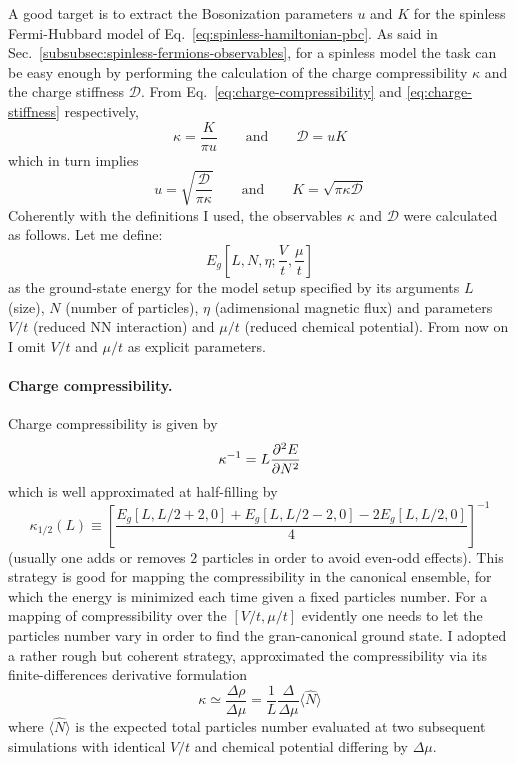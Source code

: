 A good target is to extract the Bosonization parameters $u$ and $K$ for the spinless Fermi-Hubbard model of Eq.~\eqref{eq:spinless-hamiltonian-pbc}. As said in Sec.~\ref{subsubsec:spinless-fermions-observables}, for a spinless model the task can be easy enough by performing the calculation of the charge compressibility $\kappa$ and the charge stiffness $\mathcal{D}$. From Eq.~\eqref{eq:charge-compressibility} and \eqref{eq:charge-stiffness} respectively,
\begin{equation}\label{eq:charge-compressibility-stiffness-definitions}
	\kappa = \frac{K}{\pi u}
	\qquad\text{and}\qquad
	\mathcal{D} = uK
\end{equation}
which in turn implies
\begin{equation}\label{eq:u-K-formulas}
	u = \sqrt{\frac{\mathcal{D}}{\pi\kappa}}
	\qquad\text{and}\qquad
	K = \sqrt{\pi\kappa\mathcal{D}}
\end{equation}
Coherently with the definitions I used, the observables $\kappa$ and $\mathcal{D}$ were calculated as follows. Let me define:
\begin{equation}\label{eq:fixed-number-energy-definition}
	E_g \left[
		L,N,\eta;\frac{V}{t},\frac{\mu}{t}
	\right]
\end{equation}
as the ground-state energy for the model setup specified by its arguments $L$ (size), $N$ (number of particles), $\eta$ (adimensional magnetic flux) and parameters $V/t$ (reduced NN interaction) and $\mu/t$ (reduced chemical potential). From now on I omit $V/t$ and $\mu/t$ as explicit parameters. 

\paragraph{Charge compressibility.}
Charge compressibility is given by
\[
	\kappa^{-1} = L \pdv[2]{E}{N}
\]
which is well approximated at half-filling by
\begin{equation}\label{eq:charge-compressibility-approximation}
	\kappa_{1/2}(L) \equiv \left[
		\frac{E_g[L,L/2+2,0]+E_g[L,L/2-2,0]-2E_g[L,L/2,0]}{4}
	\right]^{-1}
\end{equation}
(usually one adds or removes $2$ particles in order to avoid even-odd effects). This strategy is good for mapping the compressibility in the canonical ensemble, for which the energy is minimized each time given a fixed particles number. For a mapping of compressibility over the $[V/t,\mu/t]$ evidently one needs to let the particles number vary in order to find the gran-canonical ground state. I adopted a rather rough but coherent strategy, approximated the compressibility via its finite-differences derivative formulation
\[
	\kappa \simeq \frac{\Delta \rho}{\Delta \mu} = \frac{1}{L} \frac{\Delta}{\Delta \mu} \langle \hat N \rangle
\]
where $\langle \hat N \rangle$ is the expected total particles number evaluated at two subsequent simulations with identical $V/t$ and chemical potential differing by $\Delta \mu$.

